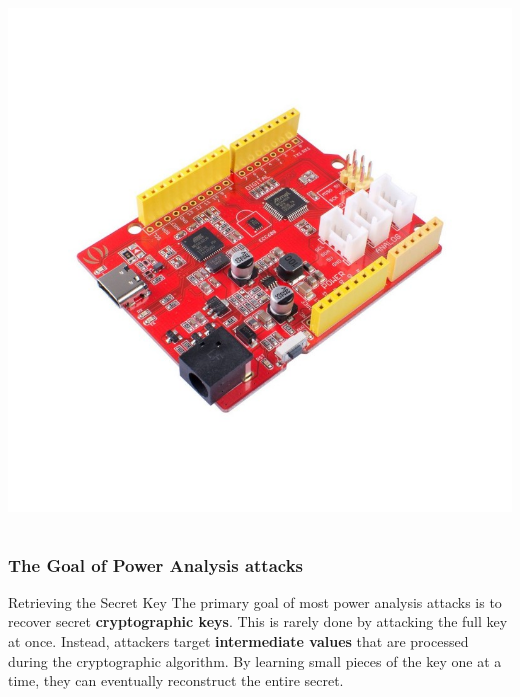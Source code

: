 \begin{frame}
\begin{columns}[T]
        \begin{column}{0.48\textwidth}
            \centering
            \includegraphics[width=\linewidth]{main thing/Pictures/mcu.jpg}
        \end{column}
    \end{columns}
\end{frame}

\begin{frame}
    \frametitle{The Goal of Power Analysis attacks}

    \begin{block}{Retrieving the Secret Key}
        The primary goal of most power analysis attacks is to recover secret \textbf{cryptographic keys}.
    \newline
        This is rarely done by attacking the full key at once. Instead, attackers target \textbf{intermediate values} that are processed during the cryptographic algorithm. By learning small pieces of the key one at a time, they can eventually reconstruct the entire secret.
    \end{block}
   
\end{frame}





